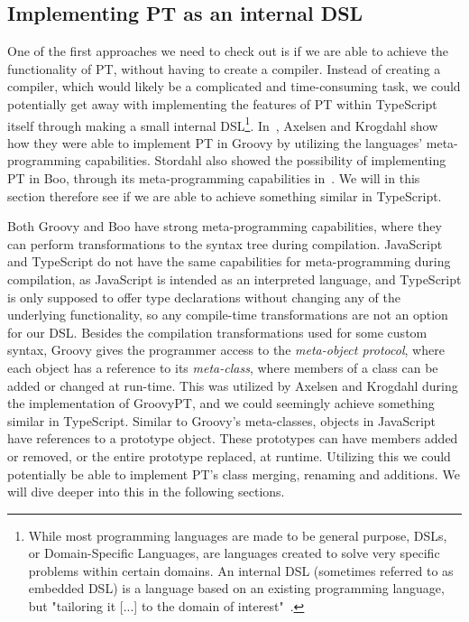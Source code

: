 \subsection{Implementing PT as an internal DSL}\label{subsec:implementing-pt-as-a-ts-library}


One of the first approaches we need to check out is if we are able to achieve the functionality of PT, without having to create a compiler.
Instead of creating a compiler, which would likely be a complicated and time-consuming task, we could potentially get away with implementing the features of PT within TypeScript itself through making a small internal DSL\footnote{While most programming languages are made to be general purpose, DSLs, or Domain-Specific Languages, are languages created to solve very specific problems within certain domains. An internal DSL (sometimes referred to as embedded DSL) is a language based on an existing programming language, but "tailoring it [...] to the domain of interest"~\cite{Hudak1997}.}.
In~\cite{groovypt}, Axelsen and Krogdahl show how they were able to implement PT in Groovy by utilizing the languages' meta-programming capabilities.
Stordahl also showed the possibility of implementing PT in Boo, through its meta-programming capabilities in~\cite{Stordahl2011}.
We will in this section therefore see if we are able to achieve something similar in TypeScript.

Both Groovy and Boo have strong meta-programming capabilities, where they can perform transformations to the syntax tree during compilation.
JavaScript and TypeScript do not have the same capabilities for meta-programming during compilation, as JavaScript is intended as an interpreted language, and TypeScript is only supposed to offer type declarations without changing any of the underlying functionality, so any compile-time transformations are not an option for our DSL\@.
Besides the compilation transformations used for some custom syntax, Groovy gives the programmer access to the \emph{meta-object protocol}, where each object has a reference to its \emph{meta-class}, where members of a class can be added or changed at run-time.
This was utilized by Axelsen and Krogdahl during the implementation of GroovyPT, and we could seemingly achieve something similar in TypeScript.
Similar to Groovy's meta-classes, objects in JavaScript have references to a prototype object.
These prototypes can have members added or removed, or the entire prototype replaced, at runtime.
Utilizing this we could potentially be able to implement PT's class merging, renaming and additions.
We will dive deeper into this in the following sections.

